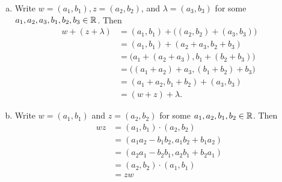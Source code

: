 \documentclass[11pt,fleqn,dvipsnames,usenames]{article}
\begin{document}
\begin{enumerate}
\begin{enumerate}[(a)]
\item Write $w = (a_{1},b_{1}), z = (a_{2},b_{2})$, and $\lambda = (a_{3},b_{3})$ for some $a_{1},a_{2},a_{3},b_{1},b_{2},b_{3}\in\mathbb{R}$.  Then
\begin{align*}
w + (z + \lambda) &= (a_{1},b_{1}) + \big((a_{2},b_{2}) + (a_{3},b_{3})\big)\\
&= (a_{1},b_{1}) + (a_{2} + a_{3},b_{2}+b_{3})\\
&= \big(a_{1} + (a_{2} + a_{3}), b_{1} + (b_{2}+b_{3})\big)\\
&= \big((a_{1} + a_{2}) + a_{3}, (b_{1} + b_{2})+b_{3}\big)\\
&= (a_{1} + a_{2}, b_{1} + b_{2}) + (a_{3},b_{3})\\
&= (w + z) + \lambda.
\end{align*}

\item Write $w = (a_{1},b_{1})$ and $z = (a_{2},b_{2})$ for some $a_{1},a_{2},b_{1},b_{2}\in\mathbb{R}$.  Then
\begin{align*}
wz &= (a_{1},b_{1})\cdot (a_{2},b_{2})\\
&= (a_{1}a_{2} - b_{1}b_{2},a_{1}b_{2} + b_{1}a_{2})\\
&= (a_{2}a_{1} - b_{2}b_{1},a_{2}b_{1} + b_{2}a_{1})\\
&= (a_{2},b_{2})\cdot (a_{1},b_{1})\\
&= zw
\end{align*}




\end{enumerate}
\end{enumerate}
\end{document}

